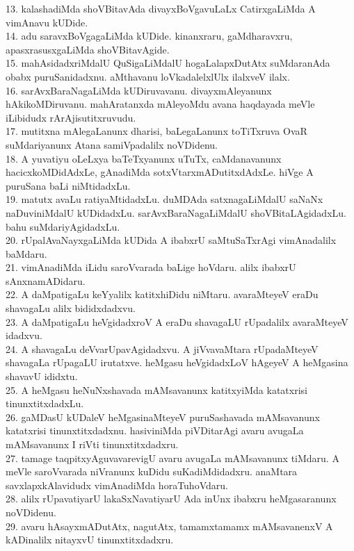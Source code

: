 \documentclass{article}
\begin{document}
13. kalashadiMda shoVBitavAda divayxBoVgavuLaLx CatirxgaLiMda A vimAnavu kUDide.\\
14. adu saravxBoVgagaLiMda kUDide. kinanxraru, gaMdharavxru, apasxrasusxgaLiMda shoVBitavAgide.\\
15. mahAsidadxriMdalU QuSigaLiMdalU hogaLalapxDutAtx suMdaranAda obabx puruSanidadxnu. aMthavanu loVkadalelxlUlx ilalxveV ilalx.\\
16. sarAvxBaraNagaLiMda kUDiruvavanu. divayxmAleyanunx hAkikoMDiruvanu. mahAratanxda mAleyoMdu avana haqdayada meVle iLibidudx rArAjisutitxruvudu.\\
17. mutitxna mAlegaLanunx dharisi, baLegaLanunx toTiTxruva OvaR suMdariyanunx Atana samiVpadalilx noVDidenu.\\
18. A yuvatiyu oLeLxya baTeTxyanunx uTuTx, caMdanavanunx hacicxkoMDidAdxLe, gAnadiMda sotxVtarxmADutitxdAdxLe. hiVge A puruSana baLi niMtidadxLu.\\
19. matutx avaLu ratiyaMtidadxLu. duMDAda satxnagaLiMdalU saNaNx naDuviniMdalU kUDidadxLu. sarAvxBaraNagaLiMdalU shoVBitaLAgidadxLu. bahu suMdariyAgidadxLu.\\
20. rUpalAvaNayxgaLiMda kUDida A ibabxrU saMtuSaTxrAgi vimAnadalilx baMdaru.\\
21. vimAnadiMda iLidu saroVvarada baLige hoVdaru. alilx ibabxrU sAnxnamADidaru.\\
22. A daMpatigaLu keYyalilx katitxhiDidu niMtaru. avaraMteyeV eraDu shavagaLu alilx bididxdadxvu.\\
23. A daMpatigaLu   heVgidadxroV A eraDu shavagaLU rUpadalilx avaraMteyeV idadxvu.\\
24. A shavagaLu deVvarUpavAgidadxvu. A jiVvavaMtara rUpadaMteyeV shavagaLa rUpagaLU irutatxve. heMgasu heVgidadxLoV hAgeyeV A heMgasina shavavU ididxtu.\\
25. A heMgasu heNuNxshavada mAMsavanunx katitxyiMda katatxrisi tinunxtitxdadxLu.\\
26. gaMDasU kUDaleV heMgasinaMteyeV puruSashavada mAMsavanunx katatxrisi tinunxtitxdadxnu. hasiviniMda piVDitarAgi avaru avugaLa mAMsavanunx I riVti tinunxtitxdadxru.\\
27. tamage taqpitxyAguvavarevigU avaru avugaLa mAMsavanunx tiMdaru. A meVle saroVvarada niVranunx kuDidu suKadiMdidadxru. anaMtara savxlapxkAlavidudx vimAnadiMda horaTuhoVdaru.\\
28. alilx rUpavatiyarU lakaSxNavatiyarU Ada inUnx ibabxru heMgasaranunx noVDidenu.\\
29. avaru hAsayxmADutAtx, nagutAtx, tamamxtamamx mAMsavanenxV A kADinalilx nitayxvU tinunxtitxdadxru.\\
\end{document}
